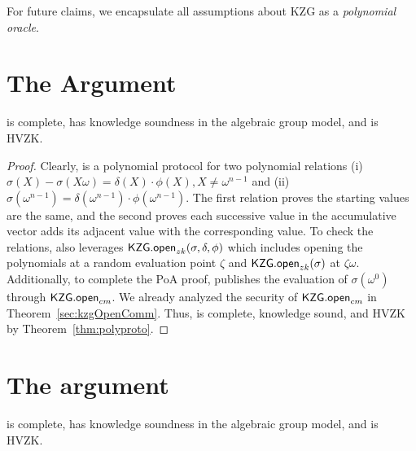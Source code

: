 For future claims, we encapsulate all assumptions about KZG as a \textit{polynomial oracle}. 


\section{The \poa Argument}

\begin{claim}
\label{thm:assets} 
\poa is complete, has knowledge soundness in the algebraic group model, and is HVZK. 
\end{claim}

\begin{proof}
Clearly, \poa is a polynomial protocol for two polynomial relations (i) $\sigma(X)-\sigma(X\omega)=\delta(X)\cdot\phi(X),X\ne{\omega^{n-1}}$ and (ii) $\sigma(\omega^{n-1})=\delta(\omega^{n-1})\cdot\phi(\omega^{n-1})$. The first relation proves the starting values are the same, and the second proves each successive value in the accumulative vector adds its adjacent value with the corresponding value. To check the relations, \poa also leverages $\mathsf{KZG.open}_{zk}(\sigma,\delta,\phi)$ which includes opening the polynomials at a random evaluation point $\zeta$ and $\mathsf{KZG.open}_{zk}(\sigma)$ at $\zeta\omega$. Additionally, to complete the PoA proof, \poa publishes the evaluation of $\sigma(\omega^0)$ through $\mathsf{KZG.open}_{cm}$. We already analyzed the security of $\mathsf{KZG.open}_{cm}$ in Theorem~\ref{sec:kzgOpenComm}. Thus, \poa is complete, knowledge sound, and HVZK by Theorem~\ref{thm:polyproto}.
\end{proof}


\section{The \pol argument}

\begin{claim}
\label{thm:liabilities} 
\pol is complete, has knowledge soundness in the algebraic group model, and is HVZK. 
\end{claim}

